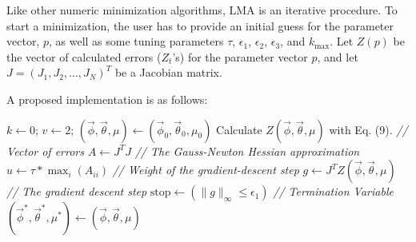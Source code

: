 \documentclass[english,10pt]{llncs}
\begin{document}
Like other numeric minimization algorithms, LMA is an iterative
procedure.  To start a minimization, the user has to provide an
initial guess for the parameter vector, $p$, as well as some tuning
parameters $\tau$, $\epsilon_1$, $\epsilon_2$, $\epsilon_3$, and $k_{\max}$.
Let $Z(p)$ be the vector of calculated errors ($Z_t$'s) for the
parameter vector $p$, and let $J = {(J_{1}, J_{2}, \ldots, J_N)}^T$
be a Jacobian matrix.

A proposed implementation is as follows:

\begin{algorithm}[ht]
    $k \leftarrow 0$; $v
  \leftarrow 2$; $(\vec{\phi},\vec{\theta},\mu) \leftarrow
  (\vec{\phi}_0,\vec{\theta}_0,\mu_0)$\; Calculate
  $Z(\vec{\phi},\vec{\theta},\mu)$ with Eq. (9).
  \textit{\footnotesize // Vector of errors}\; $A \leftarrow J^T J$
  \textit{\footnotesize // The Gauss-Newton Hessian approximation}\;
  $u\leftarrow \tau * \max_i(A_{ii})$ \textit{\footnotesize // Weight
    of the gradient-descent step}\; $g \leftarrow J^T
  Z(\vec{\phi},\vec{\theta},\mu)$ \textit{\footnotesize // The
    gradient descent step}\; $ \text{stop} \leftarrow (\|g\|_{\infty}
  \le \epsilon_1)$ \textit{\footnotesize // Termination Variable}\;
  $(\vec{\phi}^*,\vec{\theta}^*,\mu^*) \leftarrow
  (\vec{\phi},\vec{\theta},\mu)$\;

\label{alg:LM}
\end{algorithm}
\end{document}
